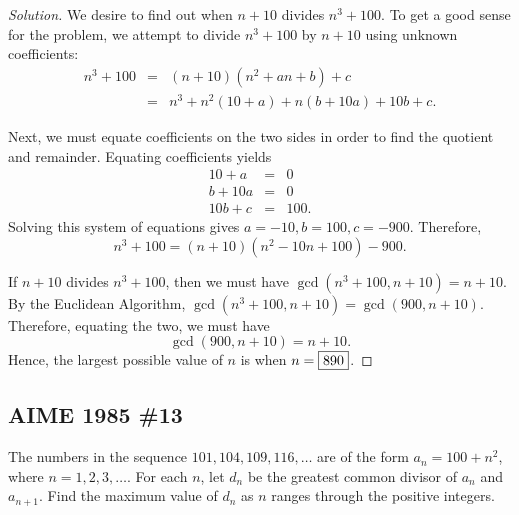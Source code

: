 \begin{proof}[Solution] We desire to find out when $n+10$ divides $n^3+100$. To get a good sense for the problem, we attempt to divide $n^3+100$ by $n+10$ using unknown coefficients: \begin{eqnarray*}  n^3+100&=&\left(n+10\right)\left(n^2+an+b\right)+c \\ &=&n^3+n^2\left(10+a\right)+n\left(b+10a\right)+10b+c. \end{eqnarray*}

Next, we must equate coefficients on the two sides in order to find the quotient and remainder. 
\clearpage 
Equating coefficients yields 
\begin{eqnarray*}
		10+a&=&0 \\ 
		b+10a&=&0 \\ 
		10b+c&=&100. \end{eqnarray*} Solving this system of equations gives $a=-10, b=100, c=-900$.  
Therefore, $$n^3+100=(n+10)(n^2-10n+100)-900.$$

\clearpage

If $n+10$ divides $n^3+100$, then we must have $\gcd(n^3+100, n+10)=n+10$. By the Euclidean Algorithm, $\gcd(n^3+100, n+10)=\gcd(900, n+10)$. Therefore, equating the two, we must have $$\gcd(900, n+10)=n+10.$$ Hence, the largest possible value of $n$ is when $n=\framebox{890}$. \end{proof}  

\clearpage

\subsection{AIME 1985 \#13}

\begin{prob} The numbers in the sequence $101, 104, 109, 116, \dots$ are of the form $a_n = 100 + n^2$, where $n = 1, 2, 3, \dots$.  For each $n$, let $d_n$ be the greatest common divisor of $a_n$ and $a_{n + 1}$.  Find the maximum value of $d_n$ as $n$ ranges through the positive integers.  \end{prob}

